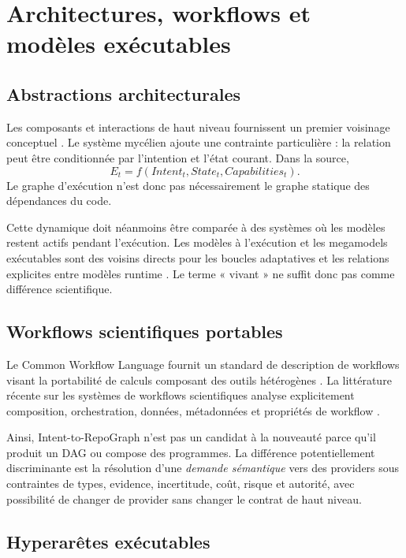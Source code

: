 \chapter{Architectures, workflows et modèles exécutables}

\section{Abstractions architecturales}

Les composants et interactions de haut niveau fournissent un premier voisinage conceptuel \cite{shaw1995architecture}. Le système mycélien ajoute une contrainte particulière : la relation peut être conditionnée par l'intention et l'état courant. Dans la source,
\[
E_t=f(Intent_t,State_t,Capabilities_t).
\]
Le graphe d'exécution n'est donc pas nécessairement le graphe statique des dépendances du code.

Cette dynamique doit néanmoins être comparée à des systèmes où les modèles restent actifs pendant l'exécution. Les modèles à l'exécution et les megamodels exécutables sont des voisins directs pour les boucles adaptatives et les relations explicites entre modèles runtime \cite{vogel2018runtime,vogel2018megamodels}. Le terme « vivant » ne suffit donc pas comme différence scientifique.

\section{Workflows scientifiques portables}

Le Common Workflow Language fournit un standard de description de workflows visant la portabilité de calculs composant des outils hétérogènes \cite{cwl12spec,crusoe2021cwl}. La littérature récente sur les systèmes de workflows scientifiques analyse explicitement composition, orchestration, données, métadonnées et propriétés de workflow \cite{sutera2025workflowterminology}.

Ainsi, Intent-to-RepoGraph n'est pas un candidat à la nouveauté parce qu'il produit un DAG ou compose des programmes. La différence potentiellement discriminante est la résolution d'une \emph{demande sémantique} vers des providers sous contraintes de types, evidence, incertitude, coût, risque et autorité, avec possibilité de changer de provider sans changer le contrat de haut niveau.

\section{Hyperarêtes exécutables}

